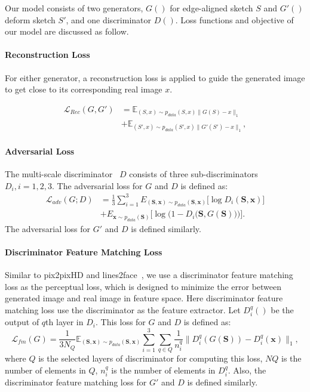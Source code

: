 
Our model consists of two generators, $G()$ for edge-aligned sketch $S$ and $G'()$ deform sketch $S'$, and one discriminator $D()$. Loss functions and objective of our model are discussed as follow.

\paragraph{Reconstruction Loss}
For either generator, a reconstruction loss is applied to guide the generated image to get close to its corresponding real image $x$.

\begin{equation}
\label{eqn:loss_rec}
\begin{aligned}
\mathcal{L}_{Rec}(G, G') &=\mathbb{E}_{(S, x)\sim p_{data}(S,x)\|G(S) - x\|_1} \\
&+ \mathbb{E}_{(S', x)\sim p_{data}(S',x)\|G'(S') - x\|_1},
\end{aligned}
\end{equation}

\paragraph{Adversarial Loss}
The multi-scale discriminator~\cite{pix2pixHD} $D$ consists of three sub-discriminators $D_i, i=1,2,3$.  The adversarial loss for $G$ and $D$ is defined as:
\begin{equation}
\label{eqn:new_loss_adv}
\begin{aligned}
\mathcal{L}_{adv}(G;D)&=\frac{1}{3}\sum_{i=1}^{3}E_{(\bm{S},\bm{x})\sim p_{data}(\bm{S},\bm{x})}\big[\log D_i(\bm{S},\bm{x})\big] \\
& + E_{\bm{x}\sim p_{data}(\bm{S})}\Big[\log \Big(1-D_i \big(\bm{S},G(\bm{S})\big)\Big)\Big].
\end{aligned}
\end{equation}
The adversarial loss for $G'$ and $D$ is defined similarly.

\paragraph{Discriminator Feature Matching Loss} Similar to pix2pixHD\cite{pix2pixHD} and lines2face~\cite{Lines2Face}, we use a discriminator feature matching loss as the perceptual loss, which is designed to minimize the error between generated image and real image in feature space. Here discriminator feature matching loss use the discriminator as the feature extractor. Let $D^q_i()$ be the output of $q$th layer in $D_i$. This loss for $G$ and $D$ is defined as:
\begin{equation}
\label{eqn:feature_matching_loss}
\mathcal{L}_{fm}(G)=\frac{1}{3N_Q}\mathbb{E}_{(\bm{S},\bm{x})\sim p_{data}(\bm{S},\bm{x})}\sum_{i=1}^{3}\sum_{q\in Q} \frac{1}{n_i^q} \|D^q_i(G(\bm{S}))-D^q_i(\bm{x})\|_1 ,
\end{equation}
where $Q$ is the selected layers of discriminator for computing this loss, $NQ$ is the number of elements in $Q$, $n^q_i$ is the number of elements in $D^q_i$.
Also, the discriminator feature matching loss for $G'$ and $D$ is defined similarly.

